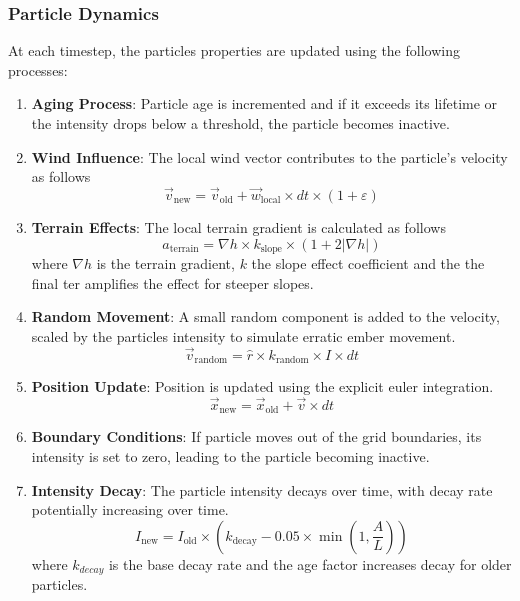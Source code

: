 \subsubsection{Particle Dynamics}
At each timestep, the particles properties are updated using the following processes:
\begin{enumerate}
	\item \textbf{Aging Process}: Particle age is incremented and if it exceeds its lifetime or the intensity drops below a threshold, the particle becomes inactive.
	\item \textbf{Wind Influence}: The local wind vector contributes to the particle's velocity as follows
	      \begin{equation}
		      \vec{v}_{\text{new}} = \vec{v}_{\text{old}} + \vec{w}_{\text{local}} \times dt \times (1 + \varepsilon)
		      \label{eq:wind}
	      \end{equation}
	\item \textbf{Terrain Effects}: The local terrain gradient is calculated as follows
	      \begin{equation}
		      a_{\text{terrain}} = \nabla h \times k_{\text{slope}} \times \left (1 + 2 \vert \nabla h \vert \right)
		      \label{eq:terrain}
	      \end{equation}
	      where $\nabla h$ is the terrain gradient, $k$ the slope effect coefficient and the the final ter amplifies the effect for steeper slopes.
	\item \textbf{Random Movement}: A small random component is added to the velocity, scaled by the particles intensity to simulate erratic ember movement.
	      \begin{equation}
		      \vec{v}_{\text{random}} = \hat{r} \times k_{\text{random}} \times I \times dt
		      \label{eq:rand_mov}
	      \end{equation}
	\item \textbf{Position Update}: Position is updated using the explicit euler integration.
	      \begin{equation}
		      \vec{x}_{\text{new}} = \vec{x}_{\text{old}} + \vec{v} \times dt
		      \label{eq:euler}
	      \end{equation}
	\item \textbf{Boundary Conditions}: If particle moves out of the grid boundaries, its intensity is set to zero, leading to the particle becoming inactive.
	\item \textbf{Intensity Decay}: The particle intensity decays over time, with decay rate potentially increasing over time.
	      \begin{equation}
		      I_{\text{new}} = I_{\text{old}} \times \left(k_{\text{decay}} - 0.05 \times \min\left(1, \frac{A}{L}\right)\right)
		      \label{eq:decay}
	      \end{equation}
	      where $k_{decay}$ is the base decay rate and the age factor increases decay for older particles.

\end{enumerate}

